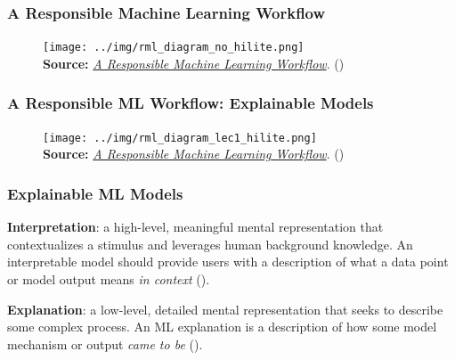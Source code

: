 \documentclass[11pt,aspectratio=169,hyperref={colorlinks}]{beamer}
\begin{document}
		\begin{frame}
		
			\frametitle{A Responsible Machine Learning Workflow}
			
			\begin{figure}[htb]
				\begin{center}
					\texttt{[image: ../img/rml\_diagram\_no\_hilite.png]}\\\vspace{5pt}
					\label{fig:blueprint_nohl}
					\scriptsize{\textbf{Source:} \href{https://www.mdpi.com/2078-2489/11/3/137/htm}{\textit{A Responsible Machine Learning Workflow}}. (\citet{rml_workflow})}
				\end{center}
			\end{figure}
		
		\end{frame}
		
		\begin{frame}
	
			\frametitle{A Responsible ML Workflow: Explainable Models}		
			
			\begin{figure}[htb]
				\begin{center}
					\texttt{[image: ../img/rml\_diagram\_lec1\_hilite.png]}\\\vspace{5pt}
					\label{fig:blueprint_l1hl}
					\scriptsize{\textbf{Source:} \href{https://www.mdpi.com/2078-2489/11/3/137/htm}{\textit{A Responsible Machine Learning Workflow}}. (\citet{rml_workflow})}
				\end{center}
			\end{figure}		
					
		\end{frame}					

		\begin{frame}
	
			\frametitle{Explainable ML Models}			
					
			\textbf{Interpretation}: a high-level, meaningful mental representation that contextualizes a stimulus and leverages human background knowledge. An interpretable model should provide users with a description of what a data point or model output means \textit{in context} (\cite{broniatowski2021psychological}).\\
			
			\vspace{10pt}
			
			\textbf{Explanation}: a low-level, detailed mental representation that seeks to describe some complex process. An ML explanation is a description of how some model mechanism or output \textit{came to be} (\cite{broniatowski2021psychological}).
			
		\end{frame}
			
\end{document}
